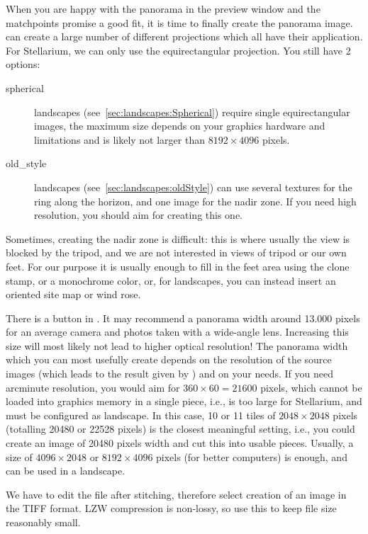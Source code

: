When you are happy with the panorama in the preview window and the
matchpoints promise a good fit, it is time to finally create the
panorama image.  can create a large number of different
projections which all have their application. For Stellarium, we can
only use the equirectangular projection. You still have 2 options: 

\begin{description}
\item[spherical] landscapes (see~\ref{sec:landscapes:Spherical}) require single equirectangular images, the
  maximum size depends on your graphics hardware and  limitations
  and is likely not larger than $8192\times4096$ pixels.
\item[old\_style] landscapes (see~\ref{sec:landscapes:oldStyle}) can use several textures for the ring
  along the horizon, and one image for the nadir zone. If you need
  high resolution, you should aim for creating this one. 
\end{description}

Sometimes, creating the nadir zone is difficult: this is where usually
the view is blocked by the tripod, and we are not interested in views
of tripod or our own feet. For our purpose it is usually enough to
fill in the feet area using the clone stamp, or a monochrome color,
or, for  landscapes, you can instead insert an oriented site
map or wind rose.

There is a button  in . It may
recommend a panorama width around 13.000 pixels for an average camera
and photos taken with a wide-angle lens. Increasing this size will
most likely not lead to higher optical resolution!  The panorama width
which you can most usefully create depends on the resolution of the
source images (which leads to the result given by ) and on your
needs. If you need arcminute resolution, you would aim for
$360\times60=21600$ pixels, which cannot be loaded into graphics
memory in a single piece, i.e., is too large for Stellarium, and must
be configured as  landscape. In this case, 10 or 11 tiles of
$2048\times2048$ pixels (totalling 20480 or 22528 pixels) is the closest
meaningful setting, i.e., you could create an image of 20480 pixels
width and cut this into usable pieces. Usually, a size of
$4096\times2048$ or $8192\times4096$ pixels (for better computers) is
enough, and can be used in a  landscape.

We have to edit the file after stitching, therefore select creation of
an image in the TIFF format. LZW compression is non-lossy, so use this
to keep file size reasonably small. 

